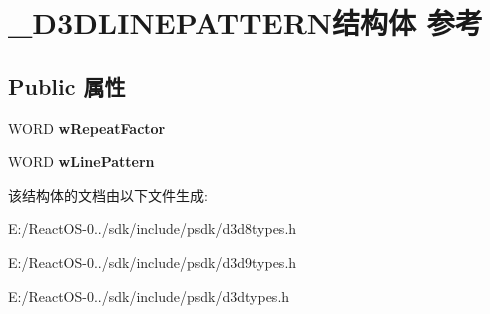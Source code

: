 \hypertarget{struct___d3_d_l_i_n_e_p_a_t_t_e_r_n}{}\section{\+\_\+\+D3\+D\+L\+I\+N\+E\+P\+A\+T\+T\+E\+R\+N结构体 参考}
\label{struct___d3_d_l_i_n_e_p_a_t_t_e_r_n}
\subsection*{Public 属性}
\begin{DoxyCompactItemize}
\item 
\mbox{\label{struct___d3_d_l_i_n_e_p_a_t_t_e_r_n_a481cea6f3ca57b4157fcb44668c3c136}} 
W\+O\+RD {\bfseries w\+Repeat\+Factor}
\item 
\mbox{\label{struct___d3_d_l_i_n_e_p_a_t_t_e_r_n_a2e8f02fbbd9f0e08b5a2a0d5db8da5d5}} 
W\+O\+RD {\bfseries w\+Line\+Pattern}
\end{DoxyCompactItemize}


该结构体的文档由以下文件生成\+:\begin{DoxyCompactItemize}
\item 
E\+:/\+React\+O\+S-\/0../sdk/include/psdk/d3d8types.\+h\item 
E\+:/\+React\+O\+S-\/0../sdk/include/psdk/d3d9types.\+h\item 
E\+:/\+React\+O\+S-\/0../sdk/include/psdk/d3dtypes.\+h\end{DoxyCompactItemize}
